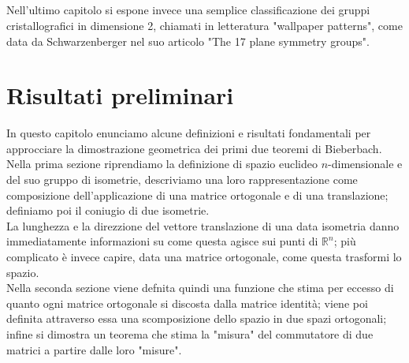 \documentclass[a4paper]{book}
\begin{document}
\paragraph{}
Nell'ultimo capitolo si espone invece una semplice classificazione dei gruppi cristallografici in dimensione 2, chiamati in letteratura "wallpaper patterns", come data da Schwarzenberger nel suo articolo "The 17 plane symmetry groups". 


\chapter{Risultati preliminari}
In questo capitolo enunciamo alcune definizioni e risultati fondamentali per approcciare la dimostrazione geometrica dei primi due teoremi di Bieberbach.  \\

Nella prima sezione riprendiamo la definizione di spazio euclideo $n$-dimensionale e del suo gruppo di isometrie, descriviamo una loro rappresentazione come composizione dell'applicazione di una matrice ortogonale e di una translazione; definiamo poi il coniugio di due isometrie. \\
La lunghezza e la direzzione del vettore translazione di una data isometria danno immediatamente informazioni su come questa agisce sui punti di $\mathbb{R}^n$; più complicato è invece capire, data una matrice ortogonale, come questa trasformi lo spazio. \\
Nella seconda sezione viene defnita quindi una funzione che stima per eccesso di quanto ogni matrice ortogonale si discosta dalla matrice identità; viene poi definita attraverso essa una scomposizione dello spazio in due spazi ortogonali; infine si dimostra un teorema che stima la "misura" del commutatore di due matrici a partire dalle loro "misure".  
\end{document}
